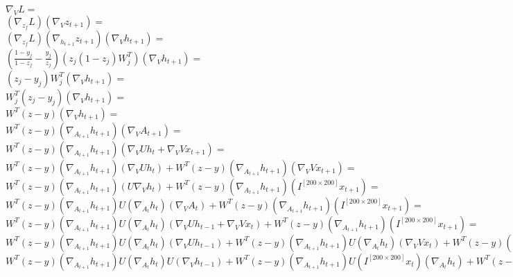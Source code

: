 \documentclass[landscape]{report}
\begin{document}
$\nabla_{V} L =$\\
$\left(\nabla_{z_f} L \right)\left( \nabla_{V} z_{t+1}\right) =$\\
$ \left(\nabla_{z_f} L \right) \left(\nabla_{h_{t+1}} z_{t+1}\right) \left( \nabla_{V} h_{t+1} \right) = $\\
$ \left( \frac{1-y_j}{1-z_j} - \frac{y_j}{z_j} \right)\left(z_j(1-z_j)W_j^T\right) \left( \nabla_{V} h_{t+1} \right) = $\\
$ \left( z_j - y_j \right)W_j^T \left( \nabla_{V} h_{t+1} \right) = $\\
$ W_j^T\left( z_j - y_j \right) \left( \nabla_{V} h_{t+1} \right) = $\\
$ W^T(z-y)\left( \nabla_{V} h_{t+1} \right) = $\\
$ W^T(z-y)\left( \nabla_{A_{t+1}} h_{t+1} \right)\left(\nabla_{V} A_{t+1}\right) =$\\
$ W^T(z-y)\left( \nabla_{A_{t+1}} h_{t+1} \right) \left(\nabla_{V} U h_t + \nabla_{V} Vx_{t+1}\right) =$\\
$ W^T(z-y)\left( \nabla_{A_{t+1}} h_{t+1} \right) \left(\nabla_{V} U h_t \right) + W^T(z-y)\left( \nabla_{A_{t+1}} h_{t+1} \right) \left(\nabla_{V} Vx_{t+1}\right) = $\\
$ W^T(z-y)\left( \nabla_{A_{t+1}} h_{t+1} \right) \left(U \nabla_{V} h_t \right) + W^T(z-y)\left( \nabla_{A_{t+1}} h_{t+1} \right) \left(I^{[200\times200]} x_{t+1}\right) = $\\
$ W^T(z-y)\left( \nabla_{A_{t+1}} h_{t+1} \right) U \left( \nabla_{A_{t}} h_{t} \right)\left(\nabla_{V} A_{t}\right) + W^T(z-y)\left( \nabla_{A_{t+1}} h_{t+1} \right) \left(I^{[200\times200]} x_{t+1}\right) = $\\
$ W^T(z-y)\left( \nabla_{A_{t+1}} h_{t+1} \right) U \left( \nabla_{A_{t}} h_{t} \right)\left(\nabla_{V} U h_{t-1} + \nabla_{V} Vx_{t}\right) + W^T(z-y)\left( \nabla_{A_{t+1}} h_{t+1} \right) \left(I^{[200\times200]} x_{t+1}\right) = $\\
$ W^T(z-y)\left( \nabla_{A_{t+1}} h_{t+1} \right) U \left( \nabla_{A_{t}} h_{t} \right)\left(\nabla_{V} U h_{t-1}\right) + W^T(z-y)\left( \nabla_{A_{t+1}} h_{t+1} \right) U \left( \nabla_{A_{t}} h_{t} \right)\left(\nabla_{V} Vx_{t}\right) + W^T(z-y)\left( \nabla_{A_{t+1}} h_{t+1} \right) \left(I^{[200\times200]} x_{t+1}\right) = $\\
$ W^T(z-y)\left( \nabla_{A_{t+1}} h_{t+1} \right) U \left( \nabla_{A_{t}} h_{t} \right) U \left(\nabla_{V} h_{t-1}\right) + W^T(z-y)\left( \nabla_{A_{t+1}} h_{t+1} \right) U \left(I^{[200\times200]} x_{t}\right)\left( \nabla_{A_{t}} h_{t} \right) + W^T(z-y) \left(I^{[200\times200]} x_{t+1}\right)\left( \nabla_{A_{t+1}} h_{t+1} \right) = $\\
\end{document}
